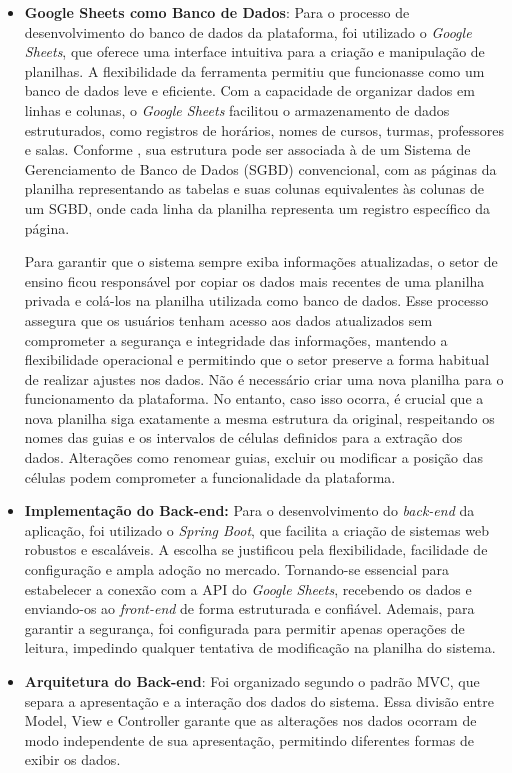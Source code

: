 \begin{itemize}
    \item \textbf{Google Sheets como Banco de Dados}: Para o processo de desenvolvimento do banco de dados da plataforma, foi utilizado o \textit{Google Sheets}, que oferece uma interface intuitiva para a criação e manipulação de planilhas. A flexibilidade da ferramenta permitiu que funcionasse como um banco de dados leve e eficiente. Com a capacidade de organizar dados em linhas e colunas, o \textit{Google Sheets} facilitou o armazenamento de dados estruturados, como registros de horários, nomes de cursos, turmas, professores e salas. Conforme , sua estrutura pode ser associada à de um Sistema de Gerenciamento de Banco de Dados (SGBD) convencional, com as páginas da planilha representando as tabelas e suas colunas equivalentes às colunas de um SGBD, onde cada linha da planilha representa um registro específico da página.

    Para garantir que o sistema sempre exiba informações atualizadas, o setor de ensino ficou responsável por copiar os dados mais recentes de uma planilha privada e colá-los na planilha utilizada como banco de dados. Esse processo assegura que os usuários tenham acesso aos dados atualizados sem comprometer a segurança e integridade das informações, mantendo a flexibilidade operacional e permitindo que o setor preserve a forma habitual de realizar ajustes nos dados. Não é necessário criar uma nova planilha para o funcionamento da plataforma. No entanto, caso isso ocorra, é crucial que a nova planilha siga exatamente a mesma estrutura da original, respeitando os nomes das guias e os intervalos de células definidos para a extração dos dados. Alterações como renomear guias, excluir ou modificar a posição das células podem comprometer a funcionalidade da plataforma.
    
    \item \textbf{Implementação do Back-end:} Para o desenvolvimento do \textit{back-end} da aplicação, foi utilizado o \textit{Spring Boot}, que facilita a criação de sistemas web robustos e escaláveis. A escolha se justificou pela flexibilidade, facilidade de configuração e ampla adoção no mercado. Tornando-se essencial para estabelecer a conexão com a API do \textit{Google Sheets}, recebendo os dados e enviando-os ao \textit{front-end} de forma estruturada e confiável. Ademais, para garantir a segurança, foi configurada para permitir apenas operações de leitura, impedindo qualquer tentativa de modificação na planilha do sistema.
    \item \textbf{Arquitetura do Back-end}: Foi organizado segundo o padrão MVC, que separa a apresentação e a interação dos dados do sistema. Essa divisão entre Model, View e Controller garante que as alterações nos dados ocorram de modo independente de sua apresentação, permitindo diferentes formas de exibir os dados.
\end{itemize}

